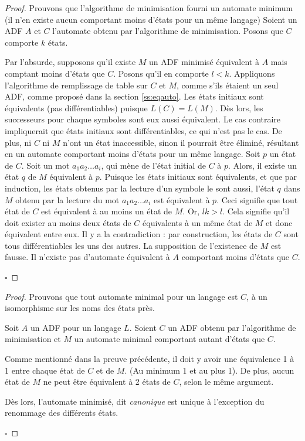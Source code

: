 \begin{proof}
 Prouvons que l'algorithme de minimisation fourni un automate minimum (il n'en existe aucun comportant moins d'états pour un même langage)
 Soient un ADF $A$ et $C$ l'automate obtenu par l'algorithme de minimisation. Posons que $C$ comporte $k$ états.

 Par l'absurde, supposons qu'il existe $M$ un ADF minimisé équivalent à $A$ mais comptant moins d'états que $C$. Posons qu'il en comporte $l<k$.
 Appliquons l'algorithme de remplissage de table sur $C$ et $M$, comme s'ils étaient un seul ADF, comme proposé dans la section \ref{ss:eqauto}. Les états initiaux sont équivalents (pas différentiables) puisque $L(C)=L(M)$. Dès lors, les successeurs pour chaque symboles sont eux aussi équivalent. Le cas contraire impliquerait que états initiaux sont différentiables, ce qui n'est pas le cas.
 De plus, ni $C$ ni $M$ n'ont un état inaccessible, sinon il pourrait être éliminé, résultant en un automate comportant moins d'états pour un même langage.
 Soit $p$ un état de $C$. Soit un mot $a_1a_2\dots a_i$, qui mène de l'état initial de $C$ à $p$. Alors, il existe un état $q$ de $M$ équivalent à $p$. Puisque les états initiaux sont équivalents, et que par induction, les états obtenus par la lecture d'un symbole le sont aussi, l'état $q$ dans $M$ obtenu par la lecture du mot $a_1a_2\dots a_i$ est équivalent à $p$. Ceci signifie que tout état de $C$ est équivalent à au moins un état de $M$.
 Or, $lk>l$. Cela signifie qu'il doit exister au moins deux états de $C$ équivalents à un même état de $M$ et donc équivalent entre eux. Il y a la contradiction : par construction, les états de $C$ sont tous différentiables les uns des autres. La supposition de l'existence de $M$ est fausse. Il n'existe pas d'automate équivalent à $A$ comportant moins d'états que $C$.

 \hfill$\square$
\end{proof}

\begin{proof}
 Prouvons que tout automate minimal pour un langage est $C$, à un isomorphisme sur les noms des états près.

 Soit $A$ un ADF pour un langage $L$. Soient $C$ un ADF obtenu par l'algorithme de minimisation et $M$ un automate minimal comportant autant d'états que $C$.

 Comme mentionné dans la preuve précédente, il doit y avoir une équivalence 1 à 1 entre chaque état de $C$ et de $M$. (Au minimum 1 et au plus 1). De plus, aucun état de $M$ ne peut être équivalent à 2 états de $C$, selon le même argument.

 Dès lors, l'automate minimisé, dit \emph{canonique} est unique à l'exception du renommage des différents états.

 \hfill$\square$
\end{proof}



